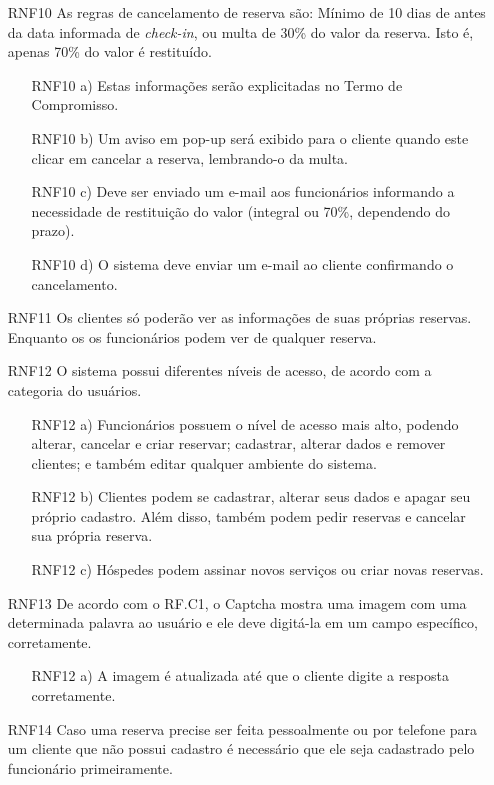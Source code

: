 \documentclass[notitlepage]{article}
\begin{document}
\begin{enumerate}
\begin{enumerate}
	\end{enumerate}	
	\item[RNF10 ] As regras de cancelamento de reserva são: Mínimo de 10 dias de antes da data informada de \textit{check-in}, ou multa de 30\% do valor da reserva. Isto é, apenas 70\% do valor é restituído. 
	\begin{enumerate}
	\item[RNF10 a) ] Estas informações serão explicitadas no Termo de Compromisso.	
	\item[RNF10 b) ] Um aviso em pop-up será exibido para o cliente quando este clicar em cancelar a reserva, lembrando-o da multa.
	\item[RNF10 c) ] Deve ser enviado um e-mail aos funcionários informando a necessidade de restituição do valor (integral ou 70\%, dependendo do prazo).
	\item[RNF10 d) ] O sistema deve enviar um e-mail ao cliente confirmando o cancelamento.
	\end{enumerate}		
	\item[RNF11 ] Os clientes só poderão ver as informações de suas próprias reservas. Enquanto os os funcionários podem ver de qualquer reserva.
	\item[RNF12 ] O sistema possui diferentes níveis de acesso, de acordo com a categoria do usuários.
	\begin{enumerate}
	\item[RNF12 a) ] Funcionários possuem o nível de acesso mais alto, podendo alterar, cancelar e criar reservar; cadastrar, alterar dados e remover clientes; e também editar qualquer ambiente do sistema.
	\item[RNF12 b) ] Clientes podem se cadastrar, alterar seus dados e apagar seu próprio cadastro. Além disso, também podem pedir reservas e cancelar sua própria reserva.
	\item[RNF12 c) ] Hóspedes podem assinar novos serviços ou criar novas reservas.
	\end{enumerate}			
	\item[RNF13 ] De acordo com o RF.C1, o Captcha mostra uma imagem com uma determinada palavra ao usuário e ele deve digitá-la em um campo específico, corretamente.
	\begin{enumerate}
	\item[RNF12 a) ] A imagem é atualizada até que o cliente digite a resposta corretamente.
	\end{enumerate}	
	\item[RNF14 ] Caso uma reserva precise ser feita pessoalmente ou por telefone para um cliente que não possui cadastro é necessário que ele seja cadastrado pelo funcionário primeiramente.

\end{enumerate}
\end{document}
